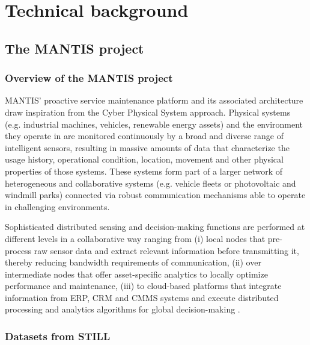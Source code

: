 \chapter{Technical background}
	\section{The MANTIS project}
		\subsection{Overview of the MANTIS project}
MANTIS' proactive service maintenance platform and its associated architecture draw inspiration from the Cyber Physical System approach. Physical systems (e.g. industrial machines, vehicles, renewable energy assets) and the environment they operate in are monitored continuously by a broad and diverse range of intelligent sensors, resulting in massive amounts of data that characterize the usage history, operational condition, location, movement and other physical properties of those systems. These systems form part of a larger network of heterogeneous and collaborative systems (e.g. vehicle fleets or photovoltaic and windmill parks) connected via robust communication mechanisms able to operate in challenging environments.

Sophisticated distributed sensing and decision-making functions are performed at different levels in a collaborative way ranging from (i) local nodes that pre-process raw sensor data and extract relevant information before transmitting it, thereby reducing bandwidth requirements of communication, (ii) over intermediate nodes that offer asset-specific analytics to locally optimize performance and maintenance, (iii) to cloud-based platforms that integrate information from ERP, CRM and CMMS systems and execute distributed processing and analytics algorithms for global decision-making \cite{Mantis}.
\clearpage
		\subsection{Datasets from STILL}
